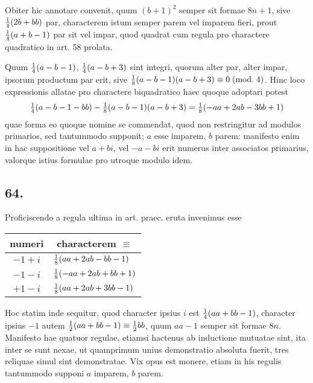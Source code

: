 \documentclass[twoside,12pt]{memoir}
\renewcommand{\pmod}[1]{\;(\textrm{mod.}\;#1)}
\let\oldfrac\frac
\def\frac#1#2{\mathchoice{\tfrac{#1}{#2}}{\oldfrac{#1}{#2}}{\genfrac{}{}{}{2}{#1}{#2\mathstrut}}{\genfrac{}{}{}{3}{#1}{#2\mathstrut}}}
\begin{document}
Obiter hic annotare convenit, quum \((b+1)^{2}\) semper sit formae \(8 n+1\), sive \(\frac{1}{4}(2 b+b b)\) par, characterem istum semper parem vel imparem fieri, prout \(\frac{1}{4}(a+b-1)\) par sit vel impar, quod quadrat cum regula pro charactere quadratico in art. 58 prolata.
 
Quum \(\frac{1}{4}(a-b-1)\), \( \frac{1}{4}(a-b+3)\) sint integri, quorum alter par, alter impar, ipsorum productum par erit, sive \(\frac{1}{8}(a-b-1)(a-b+3) \equiv 0\pmod{4}\). Hinc loco expressionis allatae pro charactere biquadratico haec quoque adoptari potest
\[\frac{1}{4}(a-b-1-b b)-\frac{1}{8}(a-b-1)(a-b+3)=\frac{1}{8}(-a a+2 a b-3 b b+1)\]
quae forma eo quoque nomine se commendat, quod non restringitur ad modulos primarios, sed tantummodo supponit; \(a\) esse imparem, \(b\) parem: manifesto enim in hac suppositione vel \(a+b i\), vel \(-a-b i\) erit numerus inter associatos primarius, valorque istius formulae pro utroque modulo idem.\pagebreak%

\subsection*{64.}
 
Proficiscendo a regula ultima in art. praec. eruta invenimus esse
\begin{center}
\begin{tabular}{c|l}
numeri &\multicolumn{1}{c}{ characterem \(\equiv\)} \\
\hline
\(-1+i\) & \(\frac{1}{8}(a a+2 a b-b b-1)\) \\
\(-1-i\) & \(\frac{1}{8}(-a a+2 a b+b b+1)\) \\
\(+1-i\) & \(\frac{1}{8}(a a+2 a b+3 b b-1)\) \\
\end{tabular}
\end{center}
Hoc statim inde sequitur, quod character ipsius \(i\) est \(\frac{1}{4}(a a+b b-1)\), character ipsius \(-1\) autem \(\frac{1}{2}(a a+b b-1) \equiv \frac{1}{2} b b\), quum \(a a-1\) semper sit formae \(8 n\). Manifesto hae quatuor regulae, etiamsi hactenus ab inductione mutuatae sint, ita inter se sunt nexae, ut quamprimum unius demonstratio absoluta fuerit, tres reliquae simul sint demonstratae. Vix opus est monere, etiam in his regulis tantummodo supponi \(a\) imparem, \(b\) parem.
\end{document}
